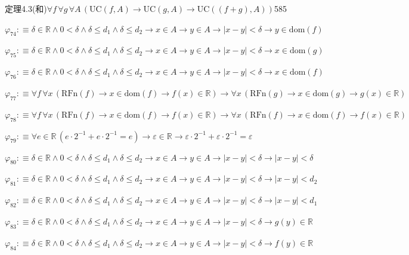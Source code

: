 \begin{fullproof}{定理4.3(和)}{$\forall f\,\forall g\,\forall A\,(\mathrm{UC}(f,A) \to \mathrm{UC}(g,A) \to \mathrm{UC}((f + g),A))$}{585}
\begin{abbrevlist}
\item $\varphi_{74} :\equiv \delta \in \mathbb{R} \land 0 < \delta \land \delta \leq d_{1} \land \delta \leq d_{2} \to x \in A \to y \in A \to \lvert x - y \rvert < \delta \to y \in \mathrm{dom}(f)$
\item $\varphi_{75} :\equiv \delta \in \mathbb{R} \land 0 < \delta \land \delta \leq d_{1} \land \delta \leq d_{2} \to x \in A \to y \in A \to \lvert x - y \rvert < \delta \to x \in \mathrm{dom}(g)$
\item $\varphi_{76} :\equiv \delta \in \mathbb{R} \land 0 < \delta \land \delta \leq d_{1} \land \delta \leq d_{2} \to x \in A \to y \in A \to \lvert x - y \rvert < \delta \to x \in \mathrm{dom}(f)$
\item $\varphi_{77} :\equiv \forall f\,\forall x\,(\mathrm{RFn}(f) \to x \in \mathrm{dom}(f) \to f(x) \in \mathbb{R}) \to \forall x\,(\mathrm{RFn}(g) \to x \in \mathrm{dom}(g) \to g(x) \in \mathbb{R})$
\item $\varphi_{78} :\equiv \forall f\,\forall x\,(\mathrm{RFn}(f) \to x \in \mathrm{dom}(f) \to f(x) \in \mathbb{R}) \to \forall x\,(\mathrm{RFn}(f) \to x \in \mathrm{dom}(f) \to f(x) \in \mathbb{R})$
\item $\varphi_{79} :\equiv \forall e \in \mathbb{R}\,(e \cdot 2^{-1} + e \cdot 2^{-1} = e) \to \varepsilon \in \mathbb{R} \to \varepsilon \cdot 2^{-1} + \varepsilon \cdot 2^{-1} = \varepsilon$
\item $\varphi_{80} :\equiv \delta \in \mathbb{R} \land 0 < \delta \land \delta \leq d_{1} \land \delta \leq d_{2} \to x \in A \to y \in A \to \lvert x - y \rvert < \delta \to \lvert x - y \rvert < \delta$
\item $\varphi_{81} :\equiv \delta \in \mathbb{R} \land 0 < \delta \land \delta \leq d_{1} \land \delta \leq d_{2} \to x \in A \to y \in A \to \lvert x - y \rvert < \delta \to \lvert x - y \rvert < d_{2}$
\item $\varphi_{82} :\equiv \delta \in \mathbb{R} \land 0 < \delta \land \delta \leq d_{1} \land \delta \leq d_{2} \to x \in A \to y \in A \to \lvert x - y \rvert < \delta \to \lvert x - y \rvert < d_{1}$
\item $\varphi_{83} :\equiv \delta \in \mathbb{R} \land 0 < \delta \land \delta \leq d_{1} \land \delta \leq d_{2} \to x \in A \to y \in A \to \lvert x - y \rvert < \delta \to g(y) \in \mathbb{R}$
\item $\varphi_{84} :\equiv \delta \in \mathbb{R} \land 0 < \delta \land \delta \leq d_{1} \land \delta \leq d_{2} \to x \in A \to y \in A \to \lvert x - y \rvert < \delta \to f(y) \in \mathbb{R}$

\end{abbrevlist}
\end{fullproof}
